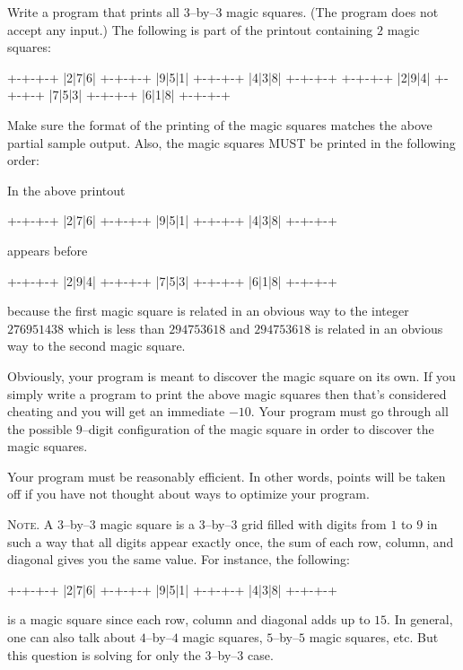 Write a program that prints all $3$--by--$3$ magic squares. (The program does
not accept any input.) The following is part of the printout containing $2$
magic squares:
\begin{console}[fontsize=\small]
+-+-+-+
|2|7|6|
+-+-+-+
|9|5|1|
+-+-+-+
|4|3|8|
+-+-+-+
+-+-+-+
|2|9|4|
+-+-+-+
|7|5|3|
+-+-+-+
|6|1|8|
+-+-+-+
\end{console}

Make sure the format of the printing of the magic squares matches the above 
partial sample output. Also, the magic squares MUST be printed in the
following order:

In the above printout
\begin{console}[fontsize=\small]
+-+-+-+
|2|7|6|
+-+-+-+
|9|5|1|
+-+-+-+
|4|3|8|
+-+-+-+
\end{console}
appears before
\begin{console}[fontsize=\small]
+-+-+-+
|2|9|4|
+-+-+-+
|7|5|3|
+-+-+-+
|6|1|8|
+-+-+-+
\end{console}
because the first magic square is related in an obvious way to the integer
$276951438$ which is less than $294753618$ and $294753618$ is related in an
obvious way to the second magic square.

Obviously, your program is meant to discover the magic square on its own. If
you simply write a program to print the above magic squares then that's
considered cheating and you will get an immediate $-10$.  Your program must go
through all the possible $9$--digit configuration of the magic square in order
to discover the magic squares.

Your program must be reasonably efficient. In other words, points will be
taken off if you have not thought about ways to optimize your program.

\textsc{Note}.
A $3$--by--$3$ magic square is a $3$--by--$3$ grid filled with digits
from $1$ to $9$ in such a way that all digits appear exactly once,
the sum of each row, column, and diagonal
gives you the same value. For instance, the following:
\begin{console}[fontsize=\small]
+-+-+-+
|2|7|6|
+-+-+-+
|9|5|1|
+-+-+-+
|4|3|8|
+-+-+-+
\end{console}
is a magic square since each row, column and diagonal adds up to $15$. In
general, one can also talk about $4$--by--$4$ magic squares, $5$--by--$5$
magic squares, etc. But this question is solving for only the $3$--by--$3$
case.
